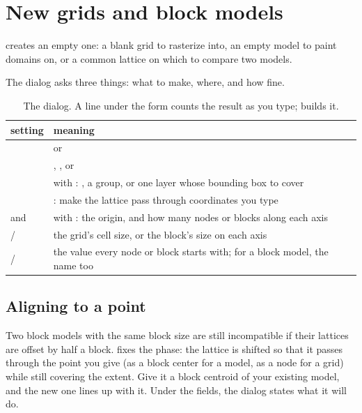\section{New grids and block models}\label{sec:grids-new}

 creates an empty one: a blank grid to rasterize into, an empty model to paint domains on, or a common lattice on which to compare two models.


The dialog asks three things: what to make, where, and how fine.

\begin{table}[htbp]
\small
\begin{tabularx}{\linewidth}{@{}lL@{}}\toprule
setting & meaning \\ \midrule
{} &  or  \\
 & , , or  \\
 & with : , a group, or one layer whose bounding box to cover \\
 & : make the lattice pass through coordinates you type \\
 and  & with : the origin, and how many nodes or blocks along each axis \\
 /  & the grid's cell size, or the block's size on each axis \\
 /  & the value every node or block starts with; for a block model, the  name too \\
\bottomrule
\end{tabularx}
\caption{The  dialog. A line under the form counts the result as you type;  builds it.}\label{tab:grids-new}
\end{table}

\subsection{Aligning to a point}

Two block models with the same block size are still incompatible if their lattices are offset by half a block.   fixes the phase: the lattice is shifted so that it passes through the point you give (as a block center for a model, as a node for a grid) while still covering the extent. Give it a block centroid of your existing model, and the new one lines up with it. Under the fields, the dialog states what it will do.

